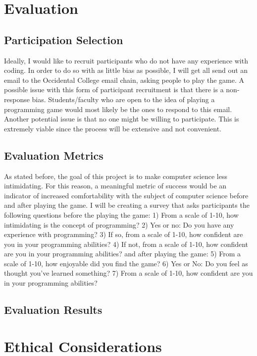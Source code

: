 \documentclass[10pt,twocolumn]{article}
\begin{document}
\section{Evaluation}

\subsection{Participation Selection}
Ideally, I would like to recruit participants who do not have any experience with coding. In order to do so with as little bias as possible, I will get all send out an email to the Occidental College email chain, asking people to play the game. A possible issue with this form of participant recruitment is that there is a non-response bias. Students/faculty who are open to the idea of playing a programming game would most likely be the ones to respond to this email. Another potential issue is that no one might be willing to participate. This is extremely viable since the process will be extensive and not convenient.
\subsection{Evaluation Metrics}

As stated before, the goal of this project is to make computer science less intimidating. For this reason, a meaningful metric of success would be an indicator of increased comfortability with the subject of computer science before and after playing the game. I will be creating a survey that asks participants the following questions before the playing the game:
1) From a scale of 1-10, how intimidating is the concept of programming?
2) Yes or no: Do you have any experience with programming?
3) If so, from a scale of 1-10, how confident are you in your programming abilities?
4) If not, from a scale of 1-10, how confident are you in your programming abilities?
and after playing the game:
5) From a scale of 1-10, how enjoyable did you find the game?
6) Yes or No: Do you feel as thought you've learned something?
7) From a scale of 1-10, how confident are you in your programming abilities?


\subsection{Evaluation Results}

\section{Ethical Considerations}


\printbibliography 
\end{document}
